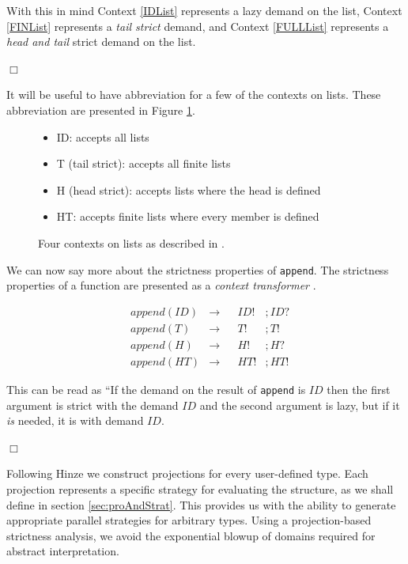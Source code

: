 With this in mind Context \ref{IDList} represents a lazy demand on the list,
Context \ref{FINList} represents a \emph{tail strict} demand, and Context
\ref{FULLList} represents a \emph{head and tail} strict demand on the list.

\hfill$\Box$

It will be useful to have abbreviation for a few of the contexts on lists. These
abbreviation are presented in Figure \ref{contexts}.

\begin{figure}[h!]
\begin{itemize}
    \item[] ID: accepts all lists
    \item[] T (tail strict): accepts all finite lists
    \item[] H (head strict): accepts lists where the head is defined
    \item[] HT: accepts finite lists where every member is defined
\end{itemize}
\caption{Four contexts on lists as described in \citep{wadler1987projections}.}
\label{contexts}
\end{figure}

We can now say more about the strictness properties of \verb'append'. The
strictness properties of a function are presented as a \emph{context
transformer} \citep{hinze1995projection}. 

\begin{align*}
    &append(ID) &\rightarrow &&ID!&;ID? \\
    &append(T)  &\rightarrow &&T!&;T! \\
    &append(H)  &\rightarrow &&H!&;H? \\
    &append(HT) &\rightarrow &&HT!&;HT!
\end{align*}

This can be read as ``If the demand on the result of \verb-append- is $ID$
then the first argument is strict with the demand $ID$ and the second
argument is lazy, but if it \emph{is} needed, it is with demand $ID$.

\hfill$\Box$

Following Hinze \citep{hinze1995projection} we construct projections
for every user-defined type. Each projection represents a
specific strategy for evaluating the structure, as we shall define in section
\ref{sec:proAndStrat}.  This provides us with the ability to generate
appropriate parallel strategies for arbitrary types. Using a
projection-based strictness analysis, we avoid the exponential blowup
of domains required for abstract interpretation.


